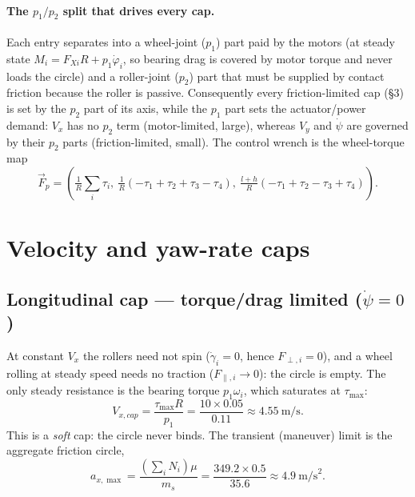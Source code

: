 \documentclass[11pt]{article}
\begin{document}
\paragraph{The $p_1/p_2$ split that drives every cap.} Each entry separates into a wheel-joint
($p_1$) part paid by the motors (at steady state $M_i=F_{Xi}R+p_1\dot\varphi_i$, so bearing drag
is covered by motor torque and never loads the circle) and a roller-joint ($p_2$) part that must
be supplied by contact friction because the roller is passive. Consequently every friction-limited
cap (\S3) is set by the $p_2$ part of its axis, while the $p_1$ part sets the actuator/power
demand: $V_x$ has no $p_2$ term (motor-limited, large), whereas $V_y$ and $\dot\psi$ are governed
by their $p_2$ parts (friction-limited, small). The control wrench is the wheel-torque map
\begin{equation}
\vec F_p=\left(\tfrac1R\textstyle\sum_i\tau_i,\ \tfrac1R(-\tau_1+\tau_2+\tau_3-\tau_4),\
\tfrac{l+h}{R}(-\tau_1+\tau_2-\tau_3+\tau_4)\right).
\end{equation}

\section{Velocity and yaw-rate caps}
\subsection{Longitudinal cap --- torque/drag limited ($\dot\psi=0$)}
At constant $V_x$ the rollers need not spin ($\dot\gamma_i=0$, hence $F_{\perp,i}=0$), and a wheel
rolling at steady speed needs no traction ($F_{\parallel,i}\to0$): the circle is empty. The only
steady resistance is the bearing torque $p_1\omega_i$, which saturates at $\tau_{\max}$:
\begin{equation}
V_{x,cap}=\frac{\tau_{\max}R}{p_1}=\frac{10\times0.05}{0.11}\approx4.55\ \text{m/s}.
\end{equation}
This is a \emph{soft} cap: the circle never binds. The transient (maneuver) limit is the
aggregate friction circle,
\begin{equation}
a_{x,\max}=\frac{(\sum_iN_i)\mu}{m_s}=\frac{349.2\times0.5}{35.6}\approx4.9\ \text{m/s}^2 .
\end{equation}
\end{document}
